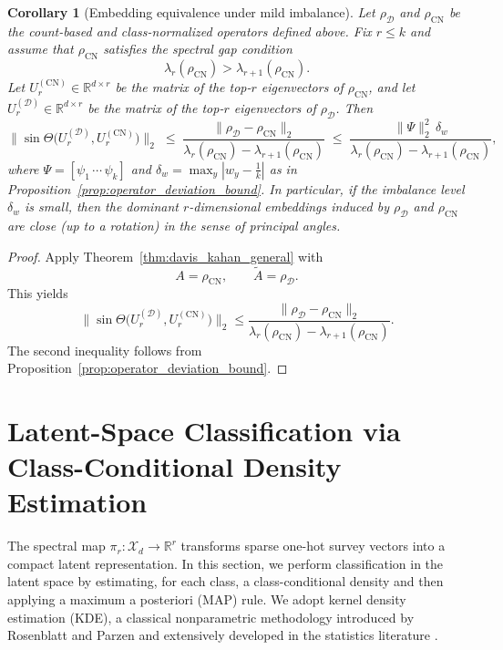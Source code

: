 \documentclass[preprint,11pt]{elsarticle}
\newtheorem{Corollary}[Theorem]{Corollary}
\newcommand{\R}{\mathbb{R}}
\begin{document}
\begin{Corollary}[Embedding equivalence under mild imbalance]
\label{cor:rho_hat_rho_embedding_equivalence}
Let $\rho_{\mathcal D}$ and $\rho_{\mathrm{CN}}$ be the count-based and class-normalized operators defined above.
Fix $r\le k$ and assume that $\rho_{\mathrm{CN}}$ satisfies the spectral gap condition
\[
\lambda_r(\rho_{\mathrm{CN}})>\lambda_{r+1}(\rho_{\mathrm{CN}}).
\]
Let $U^{(\mathrm{CN})}_r\in\R^{d\times r}$ be the matrix of the top-$r$ eigenvectors of $\rho_{\mathrm{CN}}$, and let
$U^{(\mathcal D)}_r\in\R^{d\times r}$ be the matrix of the top-$r$ eigenvectors of $\rho_{\mathcal D}$.
Then
\[
\bigl\|\sin\Theta\bigl(U^{(\mathcal D)}_r,U^{(\mathrm{CN})}_r\bigr)\bigr\|_2
\;\le\;
\frac{\|\rho_{\mathcal D}-\rho_{\mathrm{CN}}\|_2}{\lambda_r(\rho_{\mathrm{CN}})-\lambda_{r+1}(\rho_{\mathrm{CN}})}
\;\le\;
\frac{\|\Psi\|_2^2\,\delta_w}{\lambda_r(\rho_{\mathrm{CN}})-\lambda_{r+1}(\rho_{\mathrm{CN}})},
\]
where $\Psi=[\psi_1\,\cdots\,\psi_k]$ and $\delta_w=\max_y\left|w_y-\frac{1}{k}\right|$ as in
Proposition~\ref{prop:operator_deviation_bound}. In particular, if the imbalance level $\delta_w$ is small, then the dominant
$r$-dimensional embeddings induced by $\rho_{\mathcal D}$ and $\rho_{\mathrm{CN}}$ are close (up to a rotation) in the sense of principal angles.
\end{Corollary}

\begin{proof}
Apply Theorem~\ref{thm:davis_kahan_general} with
\[
A=\rho_{\mathrm{CN}},\qquad \widetilde A=\rho_{\mathcal D}.
\]
This yields
\[
\bigl\|\sin\Theta\bigl(U^{(\mathcal D)}_r,U^{(\mathrm{CN})}_r\bigr)\bigr\|_2
\le
\frac{\|\rho_{\mathcal D}-\rho_{\mathrm{CN}}\|_2}{\lambda_r(\rho_{\mathrm{CN}})-\lambda_{r+1}(\rho_{\mathrm{CN}})}.
\]
The second inequality follows from Proposition~\ref{prop:operator_deviation_bound}.
\end{proof}
\section{Latent-Space Classification via Class-Conditional Density Estimation}
\label{sec:kde_classification}

The spectral map $\pi_r:\mathcal X_d\to \R^r$ transforms sparse one-hot survey vectors into a compact latent representation.
In this section, we perform classification in the latent space by estimating, for each class, a class-conditional density and
then applying a maximum a posteriori (MAP) rule. We adopt kernel density estimation (KDE), a classical nonparametric methodology
introduced by Rosenblatt and Parzen \cite{Rosenblatt1956,Parzen1962} and extensively developed in the statistics literature
\cite{Silverman1986,Scott2015,WandJones1995}.
\end{document}
